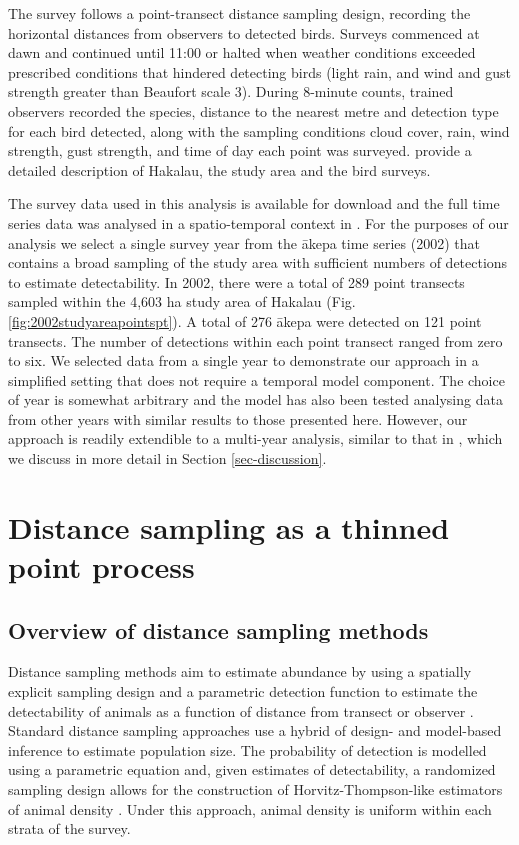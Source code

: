 \documentclass{statsoc}
\newcommand{\akepa}{\textquotesingle\={a}kepa}  %
\begin{document}
The survey follows a point-transect distance sampling design, recording the horizontal distances from observers to detected birds. Surveys commenced at dawn and continued until 11:00 or halted when weather conditions exceeded prescribed conditions that hindered detecting birds (light rain, and wind and gust strength greater than Beaufort scale 3). During 8-minute counts, trained observers recorded the species, distance to the nearest metre and detection type for each bird detected, along with the sampling conditions cloud cover, rain, wind strength, gust strength, and time of day each point was surveyed.  \cite{camp_population_2010,camp_statespace_2016} provide a detailed description of Hakalau, the study area and the bird surveys.

The survey data used in this analysis is available for download \citep{camp_datarelease_2002} and the full time series data was analysed in a spatio-temporal context in \citep{camp_dsm_2020}.  For the purposes of our analysis we select a single survey year from the \akepa{} time series (2002) that contains a broad sampling of the study area with sufficient numbers of detections to estimate detectability. In 2002, there were a total of 289 point transects sampled within the 4,603 ha study area of Hakalau (Fig. \ref{fig:2002studyareapointspt}).  A total of 276 \akepa{} were detected on 121 point transects. The number of detections within each point transect ranged from zero to six. We selected data from a single year to demonstrate our approach in a simplified setting that does not require a temporal model component.  The choice of year is somewhat arbitrary and the model has also been tested analysing data from other years with similar results to those presented here.  However, our approach is readily extendible to a multi-year analysis, similar to that in \cite{camp_dsm_2020}, which we discuss in more detail in Section \ref{sec-discussion}.

\vfill

\section{Distance sampling as a thinned point process}
\label{sec-ds-pp}

\subsection{Overview of distance sampling methods}

Distance sampling methods aim to estimate abundance by using a spatially explicit sampling design and a parametric detection function to estimate the detectability of animals as a function of distance from transect or observer \citep{buckland_distance_2015}.  Standard distance sampling approaches use a hybrid of design- and model-based inference to estimate population size.  The probability of detection is modelled using a parametric equation and, given estimates of detectability, a randomized sampling design allows for the construction of Horvitz-Thompson-like estimators of animal density \citep{ buckland_advanced_2004, horvitz_generalization_1952}.  Under this approach, animal density is uniform within each strata of the survey.  
\end{document}
